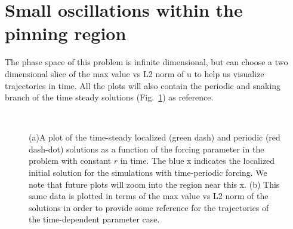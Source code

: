 \documentclass[pre,preprint,superscriptaddress]{revtex4-1}
\begin{document}
\section{Small oscillations within the pinning region}
The phase space of this problem is infinite dimensional, but can choose a two dimensional slice of the max value vs L2 norm of u to help us visualize trajectories in time.  All the plots will also contain the periodic and snaking branch of the time steady solutions (Fig.~\ref{fig:NormMaxBack}) as reference.  

\begin{figure}[!htb]
  \begin{center}
    \mbox{
       \quad
      }
    \caption{(a)A plot of the time-steady localized (green dash) and periodic (red dash-dot) solutions as a function of the forcing parameter in the problem with constant $r$ in time.  The blue x indicates the localized initial solution for the simulations with time-periodic forcing.  We note that future plots will zoom into the region near this x.  (b) This same data is plotted in terms of the max value vs L2 norm of the solutions in order to provide some reference for the trajectories of the time-dependent parameter case. }
    \label{fig:NormMaxBack}
  \end{center}
\end{figure} 
\end{document}

